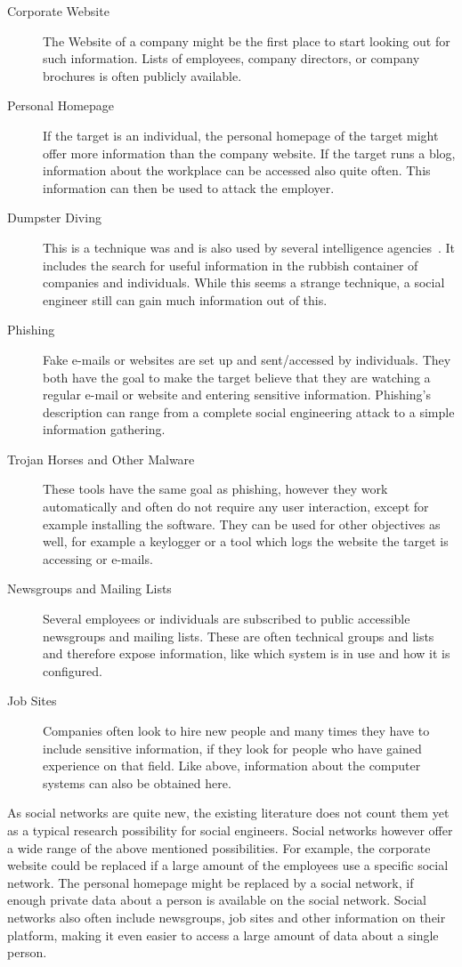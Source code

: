 \begin{description}

\item[Corporate Website] The Website of a company might be the first place to
  start looking out for such information. Lists of employees,
  company directors, or company brochures is often publicly available.
\item[Personal Homepage] If the target is an individual, the personal homepage
  of the target might offer more information than the company website. If the
  target runs a blog, information about the workplace can be accessed
  also quite often. This information can then be used to attack the employer.
\item[Dumpster Diving] This is a technique was and is also used by several
  intelligence agencies~\cite{lively2003}. It includes the search
  for useful information in the rubbish container of companies and individuals. While
  this seems a strange technique, a social engineer still can gain much
  information out of this.
\item[Phishing] Fake e-mails or websites are set up and sent/accessed by
  individuals. They both have the goal to make the target believe that they are
  watching a regular e-mail or website and entering sensitive information.
  Phishing's description can range from a complete social engineering attack to
  a simple information gathering.
\item[Trojan Horses and Other Malware] These tools have the same goal as
  phishing, however they work automatically and often do not require any
  user interaction, except for example installing the software. They can
  be used for other objectives as well, for example a keylogger or a tool
  which logs the website the target is accessing or e-mails.
\item[Newsgroups and Mailing Lists] Several employees or individuals are
  subscribed to public accessible newsgroups and mailing lists. These are often
  technical groups and lists and therefore expose information, like which system
  is in use and how it is configured.
\item[Job Sites] Companies often look to hire new people and many
  times they have to include sensitive information, if they look for
  people who have gained experience on that field. Like above, information about the
  computer systems can also be obtained here.
\end{description}

As social networks are quite new, the existing literature does not count them
yet as a typical research possibility for social engineers. Social networks
however offer a wide range of the above mentioned possibilities. For
example, the corporate website could be replaced if a large amount of the
employees use a specific social network. The personal homepage might be
replaced by a social network, if enough private data about a person is
available on the social network. Social networks also often include newsgroups,
job sites and other information on their platform, making it even easier to
access a large amount of data about a single person.


